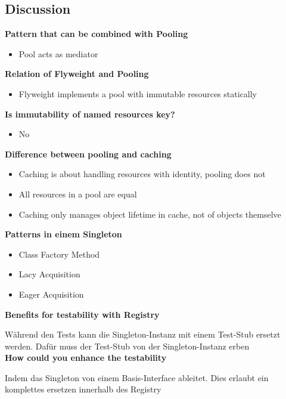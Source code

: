 \vfill\null
\columnbreak

\subsection{Discussion}
\textbf{Pattern that can be combined with Pooling}
\begin{itemize}
    \item Pool acts as mediator
\end{itemize}
\vspace{10pt}
\textbf{Relation of Flyweight and Pooling}
\begin{itemize}
    \item Flyweight implements a pool with immutable resources statically
\end{itemize}
\vspace{10pt}
\textbf{Is immutability of named resources key?}
\begin{itemize}
    \item No
\end{itemize}
\vspace{10pt}
\textbf{Difference between pooling and caching}
\begin{itemize}
    \item Caching is about handling resources with identity, pooling does not
    \item All resources in a pool are equal
    \item Caching only manages object lifetime in cache, not of objects themselve
\end{itemize}
\vspace{10pt}
\textbf{Patterns in einem Singleton}

\begin{itemize}
    \item Class Factory Method
    \item Lacy Acquisition
    \item Eager Acquisition
\end{itemize}
\vspace{10pt}
\textbf{Benefits for testability with Registry}

Während den Tests kann die Singleton-Instanz mit einem Test-Stub ersetzt werden. Dafür muss der Test-Stub von der Singleton-Instanz erben \\

\textbf{How could you enhance the testability}

Indem das Singleton von einem Basis-Interface ableitet. Dies erlaubt ein komplettes ersetzen innerhalb des Registry \\

